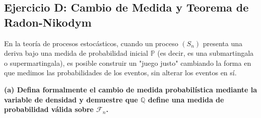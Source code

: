\documentclass[12pt, a4paper]{article}
\begin{document}
\vspace{0.5cm}

\subsection{Ejercicio D: Cambio de Medida y Teorema de Radon-Nikodym}
En la teoría de procesos estocásticos, cuando un proceso $(S_n)$ presenta una deriva bajo una medida de probabilidad inicial $\mathbb{P}$ (es decir, es una submartingala o supermartingala), es posible construir un "juego justo" cambiando la forma en que medimos las probabilidades de los eventos, sin alterar los eventos en sí.

\vspace{0.3cm}
\noindent \textbf{(a) Defina formalmente el cambio de medida probabilística mediante la variable de densidad y demuestre que $\mathbb{Q}$ define una medida de probabilidad válida sobre $\mathcal{F}_n$.}
\end{document}
